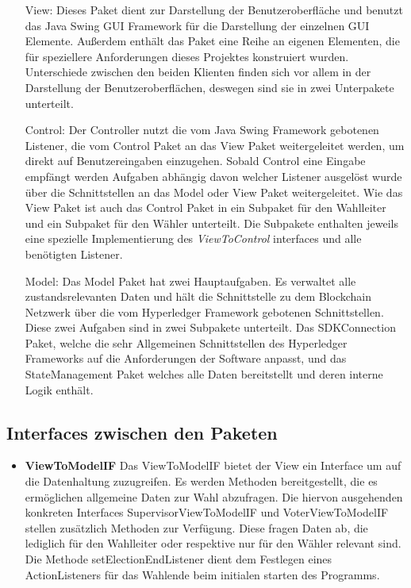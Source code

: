 \documentclass[parskip=full]{scrartcl}
\newcommand{\textitx}[1]{\mbox{\textit{#1}}}
\newcommand{\fakeparagraph}[1]{\textbf{#1}}
\begin{document}
	\begin{itemize}
		\item[View:] Dieses Paket dient zur Darstellung der Benutzeroberfläche und benutzt das Java Swing GUI Framework für die Darstellung der einzelnen GUI Elemente. Außerdem enthält das Paket eine Reihe an eigenen Elementen, die für speziellere Anforderungen dieses Projektes konstruiert wurden. Unterschiede zwischen den beiden Klienten finden sich vor allem in der Darstellung der Benutzeroberflächen, deswegen sind sie in zwei Unterpakete unterteilt.
		\item[Control:] Der Controller nutzt die vom Java Swing Framework gebotenen Listener, die vom Control Paket an das View Paket weitergeleitet werden, um direkt auf Benutzereingaben einzugehen. Sobald Control eine Eingabe empfängt werden Aufgaben abhängig davon welcher Listener ausgelöst wurde über die Schnittstellen an das Model oder View Paket weitergeleitet. Wie das View Paket ist auch das Control Paket in ein Subpaket für den Wahlleiter und ein Subpaket für den Wähler unterteilt. Die Subpakete enthalten jeweils eine spezielle Implementierung des \textitx{ViewToControl} interfaces und alle benötigten Listener.
		\item[Model:] Das Model Paket hat zwei Hauptaufgaben. Es verwaltet alle zustandsrelevanten Daten und hält die Schnittstelle zu dem Blockchain Netzwerk über die vom Hyperledger Framework gebotenen Schnittstellen. Diese zwei Aufgaben sind in zwei Subpakete unterteilt. Das SDKConnection Paket, welche die sehr Allgemeinen Schnittstellen des Hyperledger Frameworks auf die Anforderungen der Software anpasst, und das StateManagement Paket welches alle Daten bereitstellt und deren interne Logik enthält.   
	\end{itemize} 

\subsection{Interfaces zwischen den Paketen}
	\begin{itemize}
	\item\fakeparagraph{ViewToModelIF} Das ViewToModelIF bietet der View ein Interface um auf die Datenhaltung zuzugreifen.
	Es werden Methoden bereitgestellt, die es ermöglichen allgemeine Daten zur Wahl abzufragen.
	Die hiervon ausgehenden konkreten Interfaces SupervisorViewToModelIF und VoterViewToModelIF stellen zusätzlich Methoden zur Verfügung. Diese fragen Daten ab, die lediglich für den Wahlleiter oder respektive nur für den Wähler relevant sind.
	Die Methode setElectionEndListener dient dem Festlegen eines ActionListeners für das Wahlende beim initialen starten des Programms.
	\end{itemize} 
\end{document}
